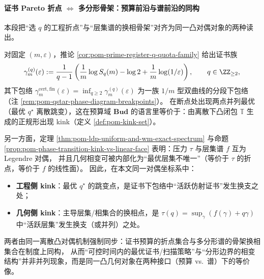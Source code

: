 
\paragraph{证书 Pareto 折点 \texorpdfstring{$\Longleftrightarrow$}{<->} 多分形骨架：预算前沿与谱前沿的同构}
本段把“选 \(q\) 的工程折点”与“层集谱的换相骨架”对齐为同一凸对偶对象的两种读出。

\begin{remark}\label{rem:pom-certificate-pareto-kink-multifractal-skeleton}
对固定 \((m,\varepsilon)\)，推论 \ref{cor:pom-prime-register-q-quota-family} 给出证书族
\[
\gamma^{(q)}_{m}(\varepsilon)
:=\frac{1}{q-1}\left(\frac{1}{m}\log S_q(m)-\log 2+\frac{1}{m}\log(1/\varepsilon)\right),
\qquad q\in\ZZ_{\ge 2},
\]
其下包络
\(
\gamma^{\mathrm{cert,fin}}_m(\varepsilon)=\inf_{q\ge 2}\gamma^{(q)}_m(\varepsilon)
\)
为一族 \(1/m\) 型双曲线的分段下包络（注 \ref{rem:pom-qstar-phase-diagram-breakpoints}）。
在断点处出现两点并列最优（最优 \(q^\star\) 离散跳变），这在预算域 \(\mathbf{Bud}\) 的语言里等价于：由离散下凸闭包 \(\mathbb{T}\) 生成的正规形出现 kink（定义 \ref{def:pom-kink-set}）。
\par
另一方面，定理 \ref{thm:pom-ldp-uniform-and-wm-exact-spectrum} 与命题 \ref{prop:pom-phase-transition-kink-vs-linear-face} 表明：压力 \(\tau\) 与层集谱 \(f\) 互为 Legendre 对偶，
并且几何相变可被内部化为“最优层集不唯一”（等价于 \(\tau\) 的折点，等价于 \(f\) 的线性面）。
因此，在本文同一对偶坐标系中：
\begin{itemize}
  \item \textbf{工程侧 kink}：最优 \(q^\star\) 的跳变点，是证书下包络中“活跃仿射证书”发生换支之处；
  \item \textbf{几何侧 kink}：主导层集/相集合的换相点，是 \(\tau(q)=\sup_\gamma(f(\gamma)+q\gamma)\) 中“活跃层集”发生换支（或并列）之处。
\end{itemize}
两者由同一离散凸对偶机制强制同步：证书预算的折点集合与多分形谱的骨架换相集合在制度上同构，
从而“可控时间内的最优证书/扫描策略”与“分形边界的相变结构”并非并列现象，而是同一凸几何对象在两种接口（预算 vs.\ 谱）下的等价像。
\end{remark}

